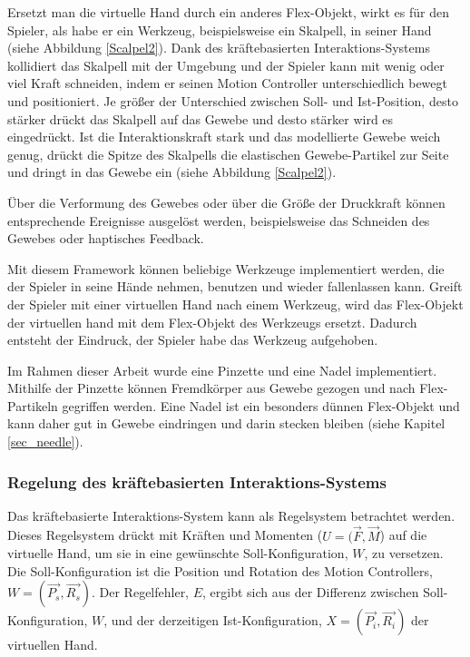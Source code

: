 Ersetzt man die virtuelle Hand durch ein anderes Flex-Objekt, wirkt es für den Spieler, als habe er ein Werkzeug, beispielsweise ein Skalpell, in seiner Hand (siehe Abbildung \ref{Scalpel2}). 
Dank des kräftebasierten Interaktions-Systems kollidiert das Skalpell mit der Umgebung und der Spieler kann mit wenig oder viel Kraft schneiden, indem er seinen Motion Controller unterschiedlich bewegt und positioniert. Je größer der Unterschied zwischen Soll- und Ist-Position, desto stärker drückt das Skalpell auf das Gewebe und desto stärker wird es eingedrückt. Ist die Interaktionskraft stark und das modellierte Gewebe weich genug, drückt die Spitze des Skalpells die elastischen Gewebe-Partikel zur Seite und dringt in das Gewebe ein (siehe Abbildung \ref{Scalpel2}).


Über die Verformung des Gewebes oder über die Größe der Druckkraft können entsprechende Ereignisse ausgelöst werden, beispielsweise das Schneiden des Gewebes oder haptisches Feedback.

Mit diesem Framework können beliebige Werkzeuge implementiert werden, die der Spieler in seine Hände nehmen, benutzen und wieder fallenlassen kann. Greift der Spieler mit einer virtuellen Hand nach einem Werkzeug, wird das Flex-Objekt der virtuellen hand mit dem Flex-Objekt des Werkzeugs ersetzt. Dadurch entsteht der Eindruck, der Spieler habe das Werkzeug aufgehoben.

Im Rahmen dieser Arbeit wurde eine Pinzette und eine Nadel implementiert. Mithilfe der Pinzette können Fremdkörper aus Gewebe gezogen und nach Flex-Partikeln gegriffen werden. Eine Nadel ist ein besonders dünnen Flex-Objekt und kann daher gut in Gewebe eindringen und darin stecken bleiben (siehe Kapitel \ref{sec_needle}).

\subsubsection{Regelung des kräftebasierten Interaktions-Systems}
Das kräftebasierte Interaktions-System kann als Regelsystem betrachtet werden. Dieses Regelsystem drückt mit Kräften und Momenten ($U = (\vec{F} , \vec{M}$) auf die virtuelle Hand, um sie in eine gewünschte Soll-Konfiguration, $W$, zu versetzen. Die Soll-Konfiguration ist die Position und Rotation des Motion Controllers, $W = (\vec{P_s} , \vec{R_s})$. Der Regelfehler, $E$, ergibt sich aus der Differenz zwischen Soll-Konfiguration, $W$, und der derzeitigen Ist-Konfiguration, $X = (\vec{P_i} , \vec{R_i})$ der virtuellen Hand.

